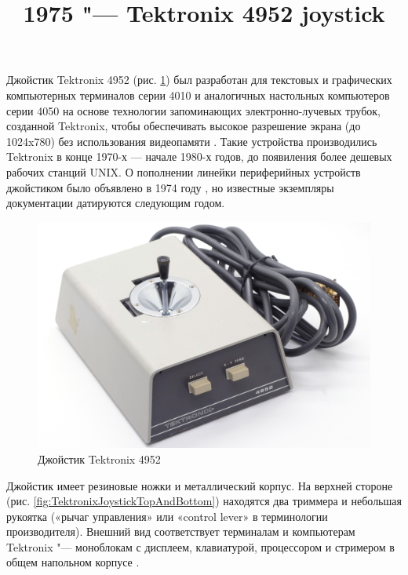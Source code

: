 \documentclass[11pt, a4paper]{article}
\begin{document}
\title{1975 "--- Tektronix 4952 joystick}
\date{}
\maketitle
{}

Джойстик Tektronix 4952 (рис. \ref{fig:TektronixJoystickPic}) был разработан для текстовых и графических компьютерных терминалов серии 4010 и аналогичных настольных компьютеров серии 4050 на основе технологии запоминающих электронно-лучевых трубок, созданной Tektronix, чтобы обеспечивать высокое разрешение экрана (до 1024x780) без использования видеопамяти \cite{wiki}. Такие устройства производились Tektronix в конце 1970-х — начале 1980-х годов, до появиления более дешевых рабочих станций UNIX. О пополнении линейки периферийных устройств джойстиком было объявлено в 1974 году \cite{adv}, но известные экземпляры документации датируются следующим годом.

\begin{figure}[h]
   \centering
    \includegraphics[scale=0.45]{1975_Tektronix_4952_Joystick/pic_30.jpg}
    \caption{Джойстик Tektronix 4952}
    \label{fig:TektronixJoystickPic}
\end{figure}

Джойстик имеет резиновые ножки и металлический корпус. На верхней стороне (рис. \ref{fig:TektronixJoystickTopAndBottom}) находятся два триммера \cite{manual} и небольшая рукоятка («рычаг управления» или «control lever» в терминологии производителя). Внешний вид соответствует терминалам и компьютерам Tektronix "--- моноблокам с дисплеем, клавиатурой, процессором и стримером в общем напольном корпусе \cite{wiki}.
\end{document}
